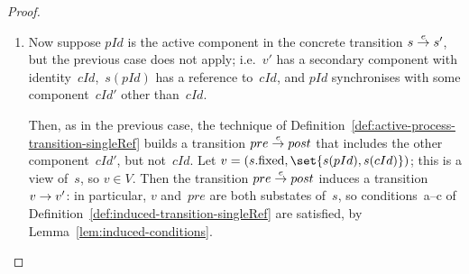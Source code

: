 \begin{proof}
\begin{enumerate}
\item 
Now suppose $pId$ is the active component in the concrete transition \( {s
  \stackrel{e}\rightarrow s'} \), but the previous case does not apply; i.e.~$v'$ has a
secondary component with identity~$cId$,\, $s(pId)$ has a reference to~$cId$,
and $pId$ synchronises with some component~$cId'$ other than~$cId$.

Then, as in the previous case, the technique of
Definition~\ref{def:active-process-transition-singleRef} builds a transition
\( pre \stackrel{e}\rightarrow post \) that includes the other component~$cId'$, but
not~$cId$.
%
Let $v = (s.\fixed, \set{s(pId), s(cId)})$; this is a view of~$s$, so $v \in V$.
Then the transition \( pre \stackrel{e}\rightarrow post \) induces a transition $v \stackrel{}\rightarrow
v'$: in particular, $v$ and~$pre$ are both substates of~$s$, so
conditions~a--c of Definition~\ref{def:induced-transition-singleRef} are
satisfied, by Lemma~\ref{lem:induced-conditions}.








\end{enumerate}
\end{proof}

